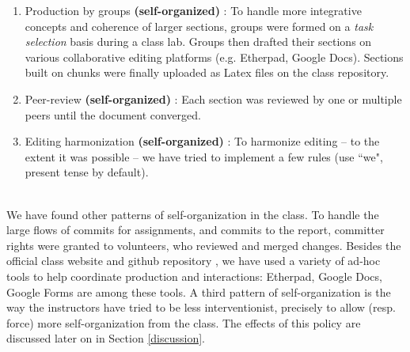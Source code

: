 \begin{enumerate}
  \item Production by groups {\bf (self-organized)} : To handle more integrative concepts and coherence of larger sections, groups were formed on a {\it task selection} basis during a class lab. Groups then drafted their sections on various collaborative editing platforms (e.g. Etherpad, Google Docs). Sections built on chunks were finally uploaded as Latex files on the class repository.
  \item Peer-review {\bf (self-organized)} : Each section was reviewed by one or multiple peers until the document converged.
  \item Editing harmonization {\bf (self-organized)} : To harmonize editing -- to the extent it was possible -- we have tried to implement a few rules (use ``we", present tense by default).
\end{enumerate}




\\ 
We have found other patterns of self-organization in the class. To handle the large flows of commits for assignments, and commits to the report, committer rights were granted to volunteers, who reviewed and merged changes. Besides 
the official class website and github repository \cite{classweb2013}, we have used a variety of ad-hoc tools to help coordinate production and interactions: Etherpad, Google Docs, Google Forms are among these tools. A third pattern of self-organization is the way the instructors have tried to be less interventionist, precisely to allow (resp. force) more self-organization from the class. The effects of this policy are discussed later on in Section \ref{discussion}.


